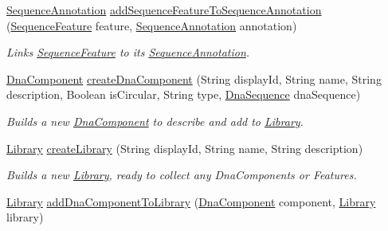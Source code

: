 \begin{DoxyCompactItemize}
\hyperlink{classorg_1_1sbolstandard_1_1lib_s_b_o_lj_1_1_sequence_annotation}{SequenceAnnotation} \hyperlink{classorg_1_1sbolstandard_1_1lib_s_b_o_lj_1_1_s_b_o_lservice_a4dbd0885b3977f121439873805a294ba}{addSequenceFeatureToSequenceAnnotation} (\hyperlink{classorg_1_1sbolstandard_1_1lib_s_b_o_lj_1_1_sequence_feature}{SequenceFeature} feature, \hyperlink{classorg_1_1sbolstandard_1_1lib_s_b_o_lj_1_1_sequence_annotation}{SequenceAnnotation} annotation)
\begin{DoxyCompactList}\small\item\em Links \hyperlink{classorg_1_1sbolstandard_1_1lib_s_b_o_lj_1_1_sequence_feature}{SequenceFeature} to its \hyperlink{classorg_1_1sbolstandard_1_1lib_s_b_o_lj_1_1_sequence_annotation}{SequenceAnnotation}. \item\end{DoxyCompactList}\item 
\hyperlink{classorg_1_1sbolstandard_1_1lib_s_b_o_lj_1_1_dna_component}{DnaComponent} \hyperlink{classorg_1_1sbolstandard_1_1lib_s_b_o_lj_1_1_s_b_o_lservice_ad3946d924f4c43fa442841aa5d56d474}{createDnaComponent} (String displayId, String name, String description, Boolean isCircular, String type, \hyperlink{classorg_1_1sbolstandard_1_1lib_s_b_o_lj_1_1_dna_sequence}{DnaSequence} dnaSequence)
\begin{DoxyCompactList}\small\item\em Builds a new \hyperlink{classorg_1_1sbolstandard_1_1lib_s_b_o_lj_1_1_dna_component}{DnaComponent} to describe and add to \hyperlink{classorg_1_1sbolstandard_1_1lib_s_b_o_lj_1_1_library}{Library}. \item\end{DoxyCompactList}\item 
\hyperlink{classorg_1_1sbolstandard_1_1lib_s_b_o_lj_1_1_library}{Library} \hyperlink{classorg_1_1sbolstandard_1_1lib_s_b_o_lj_1_1_s_b_o_lservice_a7a21049be3161d93bd273e6906899c5a}{createLibrary} (String displayId, String name, String description)
\begin{DoxyCompactList}\small\item\em Builds a new \hyperlink{classorg_1_1sbolstandard_1_1lib_s_b_o_lj_1_1_library}{Library}, ready to collect any DnaComponents or Features. \item\end{DoxyCompactList}\item 
\hyperlink{classorg_1_1sbolstandard_1_1lib_s_b_o_lj_1_1_library}{Library} \hyperlink{classorg_1_1sbolstandard_1_1lib_s_b_o_lj_1_1_s_b_o_lservice_a0f8d861cd85028c6a67c6480dc87d15e}{addDnaComponentToLibrary} (\hyperlink{classorg_1_1sbolstandard_1_1lib_s_b_o_lj_1_1_dna_component}{DnaComponent} component, \hyperlink{classorg_1_1sbolstandard_1_1lib_s_b_o_lj_1_1_library}{Library} library)

\end{DoxyCompactItemize}
